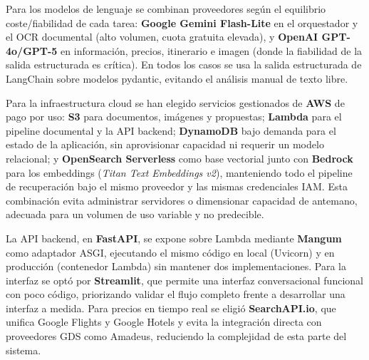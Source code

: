 Para los modelos de lenguaje se combinan proveedores según el equilibrio coste/fiabilidad de cada tarea: \textbf{Google Gemini Flash-Lite} en el orquestador y el OCR documental (alto volumen, cuota gratuita elevada), y \textbf{OpenAI GPT-4o/GPT-5} en información, precios, itinerario e imagen (donde la fiabilidad de la salida estructurada es crítica). En todos los casos se usa la salida estructurada de LangChain sobre modelos pydantic, evitando el análisis manual de texto libre.

Para la infraestructura cloud se han elegido servicios gestionados de \textbf{AWS} de pago por uso: \textbf{S3} para documentos, imágenes y propuestas; \textbf{Lambda} para el pipeline documental y la API backend; \textbf{DynamoDB} bajo demanda para el estado de la aplicación, sin aprovisionar capacidad ni requerir un modelo relacional; y \textbf{OpenSearch Serverless} como base vectorial junto con \textbf{Bedrock} para los embeddings (\textit{Titan Text Embeddings v2}), manteniendo todo el pipeline de recuperación bajo el mismo proveedor y las mismas credenciales IAM. Esta combinación evita administrar servidores o dimensionar capacidad de antemano, adecuada para un volumen de uso variable y no predecible.

La API backend, en \textbf{FastAPI}, se expone sobre Lambda mediante \textbf{Mangum} como adaptador ASGI, ejecutando el mismo código en local (Uvicorn) y en producción (contenedor Lambda) sin mantener dos implementaciones. Para la interfaz se optó por \textbf{Streamlit}, que permite una interfaz conversacional funcional con poco código, priorizando validar el flujo completo frente a desarrollar una interfaz a medida. Para precios en tiempo real se eligió \textbf{SearchAPI.io}, que unifica Google Flights y Google Hotels y evita la integración directa con proveedores GDS como Amadeus, reduciendo la complejidad de esta parte del sistema.
